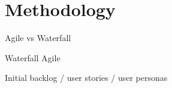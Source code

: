\section{Methodology}

Agile vs Waterfall

Waterfall
Agile

Initial backlog / user stories / user personas


